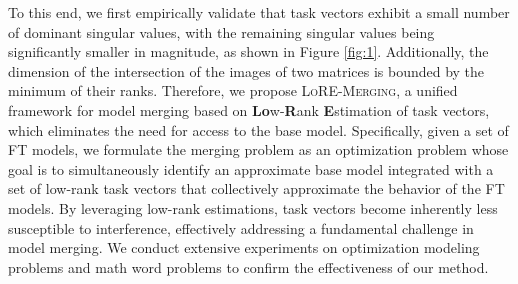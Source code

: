 To this end, we first empirically validate that task vectors exhibit a small number of dominant singular values, with the remaining singular values being significantly smaller in magnitude, as shown in Figure \ref{fig:1}. Additionally, the dimension of the intersection of the images of two matrices is bounded by the minimum of their ranks. Therefore, we propose \textsc{LoRE-Merging}, a unified framework for model merging based on \textbf{Lo}w-\textbf{R}ank \textbf{E}stimation of task vectors, which eliminates the need for access to the base model.
Specifically, given a set of FT models, we formulate the merging problem as an optimization problem whose goal is to simultaneously identify an approximate base model integrated with a set of low-rank task vectors that collectively approximate the behavior of the FT models.
By leveraging low-rank estimations, task vectors become inherently less susceptible to interference, effectively addressing a fundamental challenge in model merging.
We conduct extensive experiments on optimization modeling problems and math word problems to confirm the effectiveness of our method.




